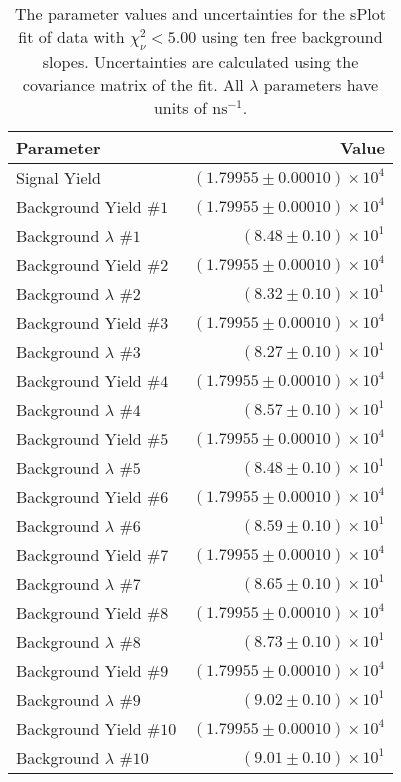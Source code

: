 
\begin{table}[ht]
    \begin{center}
        \begin{tabular}{lr}\toprule
            Parameter & Value \\\midrule
            Signal Yield & $(1.79955 \pm 0.00010) \times 10^{4}$ \\
            Background Yield $\#1$ & $(1.79955 \pm 0.00010) \times 10^{4}$ \\
            Background $\lambda$ $\#1$ & $(8.48 \pm 0.10) \times 10^{1}$ \\
            Background Yield $\#2$ & $(1.79955 \pm 0.00010) \times 10^{4}$ \\
            Background $\lambda$ $\#2$ & $(8.32 \pm 0.10) \times 10^{1}$ \\
            Background Yield $\#3$ & $(1.79955 \pm 0.00010) \times 10^{4}$ \\
            Background $\lambda$ $\#3$ & $(8.27 \pm 0.10) \times 10^{1}$ \\
            Background Yield $\#4$ & $(1.79955 \pm 0.00010) \times 10^{4}$ \\
            Background $\lambda$ $\#4$ & $(8.57 \pm 0.10) \times 10^{1}$ \\
            Background Yield $\#5$ & $(1.79955 \pm 0.00010) \times 10^{4}$ \\
            Background $\lambda$ $\#5$ & $(8.48 \pm 0.10) \times 10^{1}$ \\
            Background Yield $\#6$ & $(1.79955 \pm 0.00010) \times 10^{4}$ \\
            Background $\lambda$ $\#6$ & $(8.59 \pm 0.10) \times 10^{1}$ \\
            Background Yield $\#7$ & $(1.79955 \pm 0.00010) \times 10^{4}$ \\
            Background $\lambda$ $\#7$ & $(8.65 \pm 0.10) \times 10^{1}$ \\
            Background Yield $\#8$ & $(1.79955 \pm 0.00010) \times 10^{4}$ \\
            Background $\lambda$ $\#8$ & $(8.73 \pm 0.10) \times 10^{1}$ \\
            Background Yield $\#9$ & $(1.79955 \pm 0.00010) \times 10^{4}$ \\
            Background $\lambda$ $\#9$ & $(9.02 \pm 0.10) \times 10^{1}$ \\
            Background Yield $\#10$ & $(1.79955 \pm 0.00010) \times 10^{4}$ \\
            Background $\lambda$ $\#10$ & $(9.01 \pm 0.10) \times 10^{1}$ \\\bottomrule
        \end{tabular}
        \caption{The parameter values and uncertainties for the sPlot fit of data with $\chi^2_\nu < 5.00$ using ten free background slopes. Uncertainties are calculated using the covariance matrix of the fit. All $\lambda$ parameters have units of $\si{\nano\second}^{-1}$.}\label{tab:splot-fit-results-chisqdof-5.00-free-10}
    \end{center}
\end{table}
